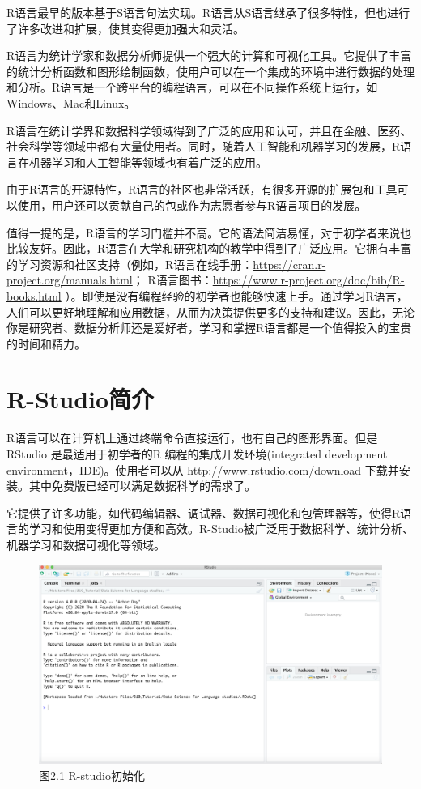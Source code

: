 \documentclass[]{book}
\begin{document}
R语言最早的版本基于S语言句法实现。R语言从S语言继承了很多特性，但也进行了许多改进和扩展，使其变得更加强大和灵活。

R语言为统计学家和数据分析师提供一个强大的计算和可视化工具。它提供了丰富的统计分析函数和图形绘制函数，使用户可以在一个集成的环境中进行数据的处理和分析。R语言是一个跨平台的编程语言，可以在不同操作系统上运行，如Windows、Mac和Linux。

R语言在统计学界和数据科学领域得到了广泛的应用和认可，并且在金融、医药、社会科学等领域中都有大量使用者。同时，随着人工智能和机器学习的发展，R语言在机器学习和人工智能等领域也有着广泛的应用。

由于R语言的开源特性，R语言的社区也非常活跃，有很多开源的扩展包和工具可以使用，用户还可以贡献自己的包或作为志愿者参与R语言项目的发展。

值得一提的是，R语言的学习门槛并不高。它的语法简洁易懂，对于初学者来说也比较友好。因此，R语言在大学和研究机构的教学中得到了广泛应用。它拥有丰富的学习资源和社区支持（例如，R语言在线手册：\url{https://cran.r-project.org/manuals.html}； R语言图书：\url{https://www.r-project.org/doc/bib/R-books.html} ）。即使是没有编程经验的初学者也能够快速上手。通过学习R语言，人们可以更好地理解和应用数据，从而为决策提供更多的支持和建议。因此，无论你是研究者、数据分析师还是爱好者，学习和掌握R语言都是一个值得投入的宝贵的时间和精力。

\hypertarget{r-studioux7b80ux4ecb}{%
\section{R-Studio简介}\label{r-studioux7b80ux4ecb}}

R语言可以在计算机上通过终端命令直接运行，也有自己的图形界面。但是RStudio 是最适用于初学者的R 编程的集成开发环境(integrated development environment，IDE)。使用者可以从 \url{http://www.rstudio.com/download} 下载并安装。其中免费版已经可以满足数据科学的需求了。

它提供了许多功能，如代码编辑器、调试器、数据可视化和包管理器等，使得R语言的学习和使用变得更加方便和高效。R-Studio被广泛用于数据科学、统计分析、机器学习和数据可视化等领域。

\begin{figure}
\centering
\includegraphics{images/2.1.png}
\caption{图2.1 R-studio初始化}
\end{figure}
\end{document}

